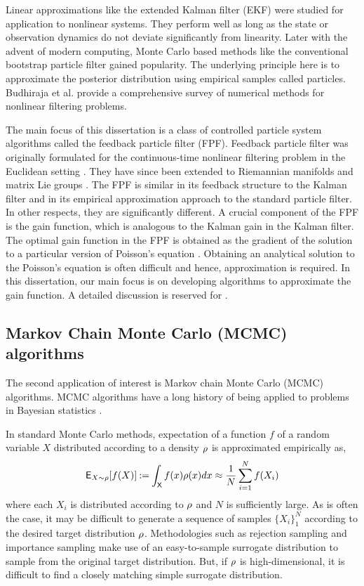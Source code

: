 Linear approximations like the extended Kalman filter (EKF) were studied for application to nonlinear systems. They perform well as long as the state or observation dynamics do not deviate significantly from linearity. Later with the advent of modern computing, Monte Carlo based methods like the conventional bootstrap particle filter gained popularity. The underlying principle here is to approximate the posterior distribution using empirical samples called particles. Budhiraja et al. \cite{budchelee07} provide a comprehensive survey of numerical methods for nonlinear filtering problems. 

The main focus of this dissertation is a class of controlled particle system algorithms called the feedback particle filter (FPF). Feedback particle filter was originally formulated for the continuous-time nonlinear filtering problem in the Euclidean setting \cite{yanmehmey13}. They have since been extended to Riemannian manifolds and matrix Lie groups \cite{zhatagmeh16}. The FPF is similar in its feedback structure to the Kalman filter and in its empirical approximation approach to the standard particle filter. In other respects, they are significantly different. A crucial component of the FPF is the gain function, which is analogous to the Kalman gain in the Kalman filter. The optimal gain function in the FPF is obtained as the gradient of the solution to a particular version of Poisson's equation \cite{yanmehmey13, laumehmeyrag14}. Obtaining an analytical solution to the Poisson's equation is often difficult and hence, approximation is required. In this dissertation, our main focus is on developing algorithms to approximate the gain function. A detailed discussion is reserved for . 

\subsection{Markov Chain Monte Carlo (MCMC) algorithms}
The second application of interest is Markov chain Monte Carlo (MCMC) algorithms. MCMC algorithms have a long history of being applied to problems in Bayesian statistics \cite{}. 

In standard Monte Carlo methods, expectation of a function $f$ of a random variable $X$ distributed according to a density $\rho$ is approximated empirically as,
\begin{equation}
 \Expect_{X \sim \pr} [f(X)] \eqdef \int_\state f(x)\pr(x) dx \approx \frac{1}{N} \sum_{i=1}^N f(X_i)
 \label{e:emp_avg} 
\end{equation}
where each $X_i$ is distributed according to $\rho$ and $N$ is sufficiently large. As is often the case, it may be difficult to generate a sequence of samples $\{X_i\}_1^N$ according to the desired target distribution $\rho$. Methodologies such as rejection sampling and importance sampling make use of an easy-to-sample surrogate distribution to sample from the original target distribution. But, if $\rho$ is high-dimensional, it is difficult to find a closely matching simple surrogate distribution. 

